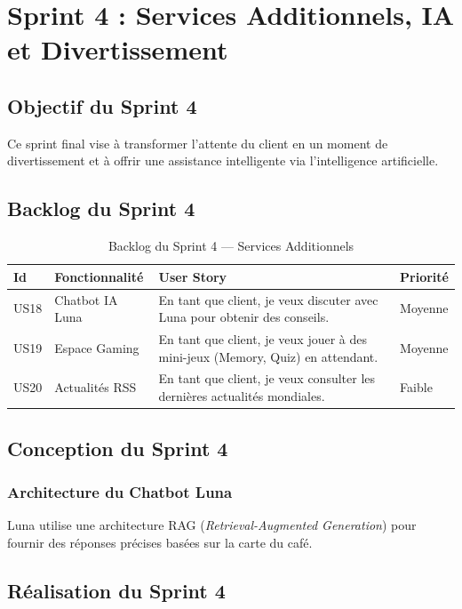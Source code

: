 \section{Sprint 4 : Services Additionnels, IA et Divertissement}

\subsection{Objectif du Sprint 4}
Ce sprint final vise à transformer l'attente du client en un moment de divertissement et à offrir une assistance intelligente via l'intelligence artificielle.

\subsection{Backlog du Sprint 4}
\begin{table}[H]
\centering
\caption{Backlog du Sprint 4 — Services Additionnels}
\renewcommand{\arraystretch}{1.3}
\small
\begin{tabular}{|p{1cm}|p{3.5cm}|p{6cm}|p{1.5cm}|}
\hline
\textbf{Id} & \textbf{Fonctionnalité} & \textbf{User Story} & \textbf{Priorité} \\
\hline
US18 & Chatbot IA Luna & En tant que client, je veux discuter avec Luna pour obtenir des conseils. & Moyenne \\
\hline
US19 & Espace Gaming & En tant que client, je veux jouer à des mini-jeux (Memory, Quiz) en attendant. & Moyenne \\
\hline
US20 & Actualités RSS & En tant que client, je veux consulter les dernières actualités mondiales. & Faible \\
\hline
\end{tabular}
\end{table}

\subsection{Conception du Sprint 4}
\subsubsection{Architecture du Chatbot Luna}
Luna utilise une architecture RAG (\textit{Retrieval-Augmented Generation}) pour fournir des réponses précises basées sur la carte du café.

\subsection{Réalisation du Sprint 4}
